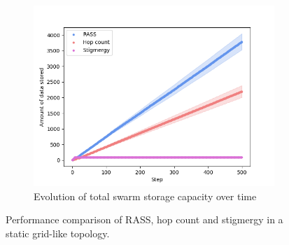 \documentclass[sigconf]{aamas}
\begin{document}
\begin{figure}
\begin{subfigure}{0.30\textwidth}
        \includegraphics[width=\textwidth]{figures/grid_storage.png}
        \caption{Evolution of total swarm storage capacity over time}
        \label{results:grid_100_storage}
    \end{subfigure}
    \caption{Performance comparison of RASS, hop count and stigmergy in a static grid-like topology.}
    \label{results:staticTopology}
    \vspace{-2mm}
\end{figure}
\end{document}
